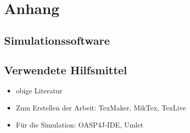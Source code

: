 \section*{Anhang}
\subsection*{Simulationssoftware}
\steffen

\subsection*{Verwendete Hilfsmittel}
\begin{itemize}
	\item obige Literatur
	\item Zum Erstellen der Arbeit: TexMaker, MikTex, TexLive
	\item Für die Simulation: OASP4J-IDE, Umlet
\end{itemize}
